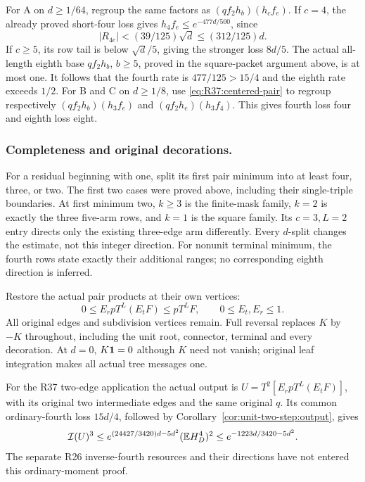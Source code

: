 For A on \(d\ge1/64\), regroup the same factors as
\((qf_2h_b)(h_cf_e)\). If \(c=4\), the already proved short-four
loss gives \(h_4f_e\le e^{-477d/500}\), since
\[
 |R_{4e}|<(39/125)\sqrt d\le(312/125)d.
\]
If \(c\ge5\), its row tail is below \(\sqrt d/5\), giving
the stronger loss \(8d/5\).
The actual all-length eighth base \(qf_2h_b\), \(b\ge5\),
proved in the square-packet argument above, is at most one.
It follows that the fourth rate is \(477/125>15/4\) and the
eighth rate exceeds \(1/2\).
For B and C on \(d\ge1/8\), use
\eqref{eq:R37:centered-pair} to regroup respectively
\((qf_2h_b)(h_3f_e)\) and \((qf_2h_e)(h_3f_4)\).
This gives fourth loss four and eighth loss eight.

\subsubsection{Completeness and original decorations.}\label{part:unit-p:decorations}
For a residual beginning with one, split its first pair minimum
into at least four, three, or two. The first two cases were proved
above, including their single-triple boundaries.
At first minimum two, \(k\ge3\) is the finite-mask family,
\(k=2\) is exactly the three five-arm rows, and \(k=1\) is the
square family. Its \(c=3,L=2\) entry directs only the existing
three-edge arm differently. Every \(d\)-split changes the estimate,
not this integer direction.
For nonunit terminal minimum, the fourth rows state exactly their
additional ranges; no corresponding eighth direction is inferred.

Restore the actual pair products at their own vertices:
\[
 0\le E_rpT^L(E_tF)\le pT^LF,\qquad 0\le E_t,E_r\le1 .
\]
All original edges and subdivision vertices remain.
Full reversal replaces \(K\) by \(-K\) throughout, including the
unit root, connector, terminal and every decoration.
At \(d=0\), \(K\mathbf1=0\) although \(K\) need not vanish; original
leaf integration makes all actual tree messages one.

For the R37 two-edge application the actual output is
\(U=T^2[E_rpT^L(E_tF)]\), with its original two intermediate
edges and the same original \(q\). Its common ordinary-fourth
loss \(15d/4\), followed by
Corollary~\ref{cor:unit-two-step:output}, gives
\[
 \mathcal I(U)^3\le
 e^{(24427/3420)d-5d^2}(\mathbb E H_D^4)^2
 \le e^{-1223d/3420-5d^2}.
\]
The separate R26 inverse-fourth resources and their directions
have not entered this ordinary-moment proof.
